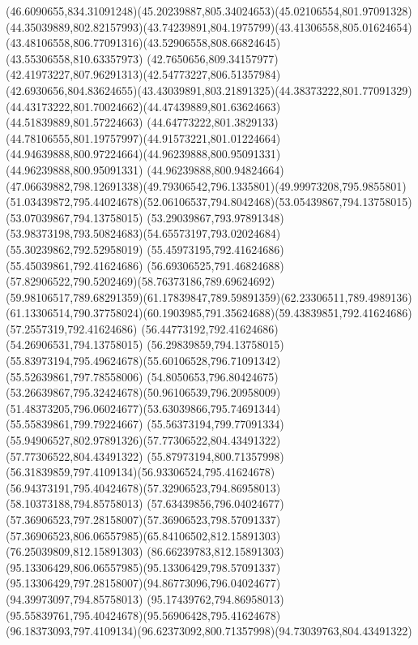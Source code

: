 {{	\curveto(46.6090655,834.31091248)(45.20239887,805.34024653)(45.02106554,801.97091328)
	\curveto(44.35039889,802.82157993)(43.74239891,804.1975799)(43.41306558,805.01624654)
	\curveto(43.48106558,806.77091316)(43.52906558,808.66824645)(43.55306558,810.63357973)
	\curveto(42.7650656,809.34157977)(42.41973227,807.96291313)(42.54773227,806.51357984)
	\curveto(42.6930656,804.83624655)(43.43039891,803.21891325)(44.38373222,801.77091329)
	\curveto(44.43173222,801.70024662)(44.47439889,801.63624663)(44.51839889,801.57224663)
	\curveto(44.64773222,801.3829133)(44.78106555,801.19757997)(44.91573221,801.01224664)
	\curveto(44.94639888,800.97224664)(44.96239888,800.95091331)(44.96239888,800.95091331)
	\lineto(44.96239888,800.94824664)
	\curveto(47.06639882,798.12691338)(49.79306542,796.1335801)(49.99973208,795.9855801)
	\curveto(51.03439872,795.44024678)(52.06106537,794.8042468)(53.05439867,794.13758015)
	\lineto(53.07039867,794.13758015)
	\lineto(53.29039867,793.97891348)
	\curveto(53.98373198,793.50824683)(54.65573197,793.02024684)(55.30239862,792.52958019)
	\lineto(55.45973195,792.41624686)
	\lineto(55.45039861,792.41624686)
	\curveto(56.69306525,791.46824688)(57.82906522,790.5202469)(58.76373186,789.69624692)
	\curveto(59.98106517,789.68291359)(61.17839847,789.59891359)(62.23306511,789.4989136)
	\curveto(61.13306514,790.37758024)(60.1903985,791.35624688)(59.43839851,792.41624686)
	\lineto(57.2557319,792.41624686)
	\lineto(56.44773192,792.41624686)
	\lineto(54.26906531,794.13758015)
	\lineto(56.29839859,794.13758015)
	\curveto(55.83973194,795.49624678)(55.60106528,796.71091342)(55.52639861,797.78558006)
	\curveto(54.8050653,796.80424675)(53.26639867,795.32424678)(50.96106539,796.20958009)
	\curveto(51.48373205,796.06024677)(53.63039866,795.74691344)(55.55839861,799.79224667)
	\lineto(55.56373194,799.77091334)
	\curveto(55.94906527,802.97891326)(57.77306522,804.43491322)(57.77306522,804.43491322)
	\curveto(55.87973194,800.71357998)(56.31839859,797.4109134)(56.93306524,795.41624678)
	\curveto(56.94373191,795.40424678)(57.32906523,794.86958013)(58.10373188,794.85758013)
	\curveto(57.63439856,796.04024677)(57.36906523,797.28158007)(57.36906523,798.57091337)
	\curveto(57.36906523,806.06557985)(65.84106502,812.15891303)(76.25039809,812.15891303)
	\curveto(86.66239783,812.15891303)(95.13306429,806.06557985)(95.13306429,798.57091337)
	\curveto(95.13306429,797.28158007)(94.86773096,796.04024677)(94.39973097,794.85758013)
	\curveto(95.17439762,794.86958013)(95.55839761,795.40424678)(95.56906428,795.41624678)
	\curveto(96.18373093,797.4109134)(96.62373092,800.71357998)(94.73039763,804.43491322)
}}
